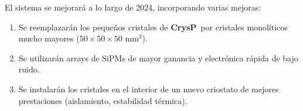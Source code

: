 \documentclass[12pt,a4paper,article]{report} %
\def\ged{{\bf GeHP1}}
\def\crysp{{\bf CrysP}}
\begin{document}
El sistema se mejorará a lo largo de 2024, incorporando varias mejoras:

\begin{enumerate}
\item Se reemplazarán los pequeños cristales de \crysp\ por cristales monolíticos mucho mayores ($50 \times 50 \times 50$ mm$^3$). 
\item Se utilizarán arrays de SiPMs de mayor ganancia y electrónica rápida de bajo ruido.  
\item Se instalarán los cristales en el interior de un nuevo criostato de mejores prestaciones (aislamiento, estabilidad térmica). 
\end{enumerate}

%
%
%
%
\end{document}
